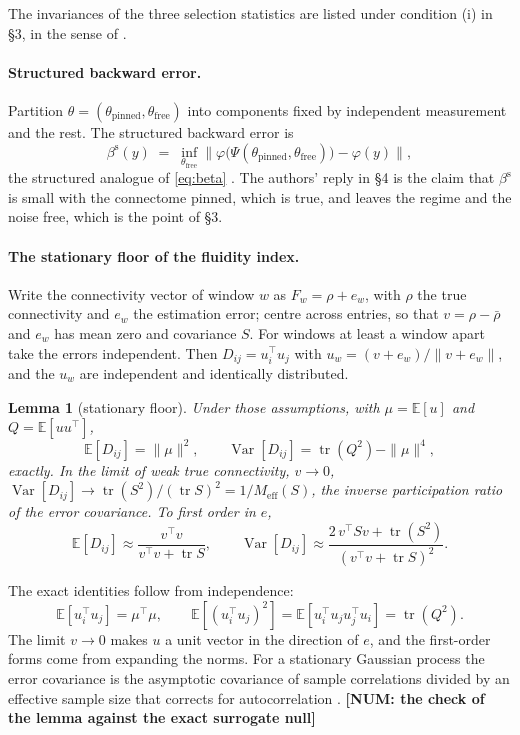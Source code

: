 \documentclass[11pt]{article}
\newtheorem{lemma}{Lemma}
\newcommand{\NUM}[1]{\textcolor{red!70!black}{\textbf{[NUM: #1]}}}
\begin{document}
The invariances of the three selection statistics are listed under condition (i) in \S3, in the sense of \textcite[ch.~6]{lehmann2005}.

\paragraph{Structured backward error.} Partition $\theta=(\theta_{\mathrm{pinned}},\theta_{\mathrm{free}})$ into components fixed by independent measurement and the rest. The structured backward error is
\[
\beta^{\mathrm{s}}(y)\;=\;\inf_{\theta_{\mathrm{free}}}\bigl\|\varphi\bigl(\Psi(\theta_{\mathrm{pinned}},\theta_{\mathrm{free}})\bigr)-\varphi(y)\bigr\| ,
\]
the structured analogue of \eqref{eq:beta} \parencite{highamhigham1992}. The authors' reply in \S4 is the claim that $\beta^{\mathrm{s}}$ is small with the connectome pinned, which is true, and leaves the regime and the noise free, which is the point of \S3.

\paragraph{The stationary floor of the fluidity index.} Write the connectivity vector of window $w$ as $F_w=\rho+e_w$, with $\rho$ the true connectivity and $e_w$ the estimation error; centre across entries, so that $v=\rho-\bar\rho$ and $e_w$ has mean zero and covariance $S$. For windows at least a window apart take the errors independent. Then $D_{ij}=u_i^{\top}u_j$ with $u_w=(v+e_w)/\|v+e_w\|$, and the $u_w$ are independent and identically distributed.
\begin{lemma}[stationary floor]
Under those assumptions, with $\mu=\mathbb{E}[u]$ and $Q=\mathbb{E}[uu^{\top}]$,
\[
\mathbb{E}[D_{ij}]=\|\mu\|^{2},\qquad \operatorname{Var}[D_{ij}]=\operatorname{tr}(Q^{2})-\|\mu\|^{4},
\]
exactly. In the limit of weak true connectivity, $v\to 0$, $\operatorname{Var}[D_{ij}]\to\operatorname{tr}(S^{2})/(\operatorname{tr}S)^{2}=1/M_{\mathrm{eff}}(S)$, the inverse participation ratio of the error covariance. To first order in $e$,
\[
\mathbb{E}[D_{ij}]\approx\frac{v^{\top}v}{v^{\top}v+\operatorname{tr}S},\qquad
\operatorname{Var}[D_{ij}]\approx\frac{2\,v^{\top}Sv+\operatorname{tr}(S^{2})}{(v^{\top}v+\operatorname{tr}S)^{2}} .
\]
\end{lemma}
The exact identities follow from independence:
\[
\mathbb{E}[u_i^{\top}u_j]=\mu^{\top}\mu, \qquad \mathbb{E}[(u_i^{\top}u_j)^{2}]=\mathbb{E}[u_i^{\top}u_ju_j^{\top}u_i]=\operatorname{tr}(Q^{2}).
\]
The limit $v\to0$ makes $u$ a unit vector in the direction of $e$, and the first-order forms come from expanding the norms. For a stationary Gaussian process the error covariance is the asymptotic covariance of sample correlations \parencite{steiger1980} divided by an effective sample size that corrects for autocorrelation \parencite{bartlett1935}. \NUM{the check of the lemma against the exact surrogate null}

\printbibliography
\end{document}

